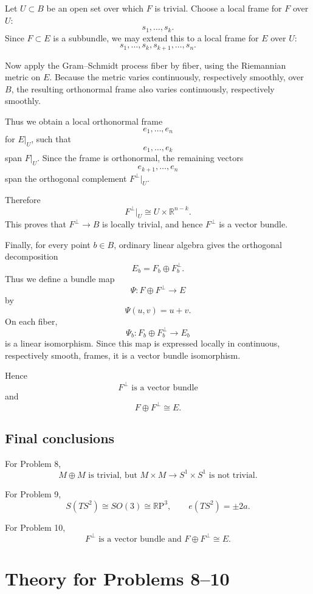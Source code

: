 \documentclass[12pt,a4paper]{article}
\newcommand{\RP}{\mathbb{R}\mathrm{P}}
\theoremstyle{notespace}
\begin{document}
	Let \(U\subset B\) be an open set over which \(F\) is trivial. Choose a local frame for \(F\) over \(U\):
	\[
	s_{1},\dots,s_{k}.
	\]
	Since \(F\subset E\) is a subbundle, we may extend this to a local frame for \(E\) over \(U\):
	\[
	s_{1},\dots,s_{k},s_{k+1},\dots,s_{n}.
	\]
	
	Now apply the Gram--Schmidt process fiber by fiber, using the Riemannian metric on \(E\). Because the metric varies continuously, respectively smoothly, over \(B\), the resulting orthonormal frame also varies continuously, respectively smoothly.
	
	Thus we obtain a local orthonormal frame
	\[
	e_{1},\dots,e_{n}
	\]
	for \(E|_{U}\), such that
	\[
	e_{1},\dots,e_{k}
	\]
	span \(F|_{U}\). Since the frame is orthonormal, the remaining vectors
	\[
	e_{k+1},\dots,e_{n}
	\]
	span the orthogonal complement \(F^{\perp}|_{U}\).
	
	Therefore
	\[
	F^{\perp}|_{U}\cong U\times \mathbb R^{n-k}.
	\]
	This proves that \(F^{\perp}\to B\) is locally trivial, and hence \(F^{\perp}\) is a vector bundle.
	
	Finally, for every point \(b\in B\), ordinary linear algebra gives the orthogonal decomposition
	\[
	E_{b}=F_{b}\oplus F_{b}^{\perp}.
	\]
	Thus we define a bundle map
	\[
	\Psi:F\oplus F^{\perp}\to E
	\]
	by
	\[
	\Psi(u,v)=u+v.
	\]
	On each fiber,
	\[
	\Psi_{b}:F_{b}\oplus F_{b}^{\perp}\to E_{b}
	\]
	is a linear isomorphism. Since this map is expressed locally in continuous, respectively smooth, frames, it is a vector bundle isomorphism.
	
	Hence
	\[
	\boxed{F^{\perp}\text{ is a vector bundle}}
	\]
	and
	\[
	\boxed{F\oplus F^{\perp}\cong E.}
	\]
	
	\subsection*{Final conclusions}
	
	For Problem 8,
	\[
	\boxed{M\oplus M\text{ is trivial, but }M\times M\to S^{1}\times S^{1}\text{ is not trivial}.}
	\]
	
	For Problem 9,
	\[
	\boxed{S(TS^{2})\cong SO(3)\cong \RP^{3},\qquad e(TS^{2})=\pm 2a.}
	\]
	
	For Problem 10,
	\[
	\boxed{F^{\perp}\text{ is a vector bundle and }F\oplus F^{\perp}\cong E.}
	\]




	
	\section{Theory for Problems 8--10}
	
\end{document}
